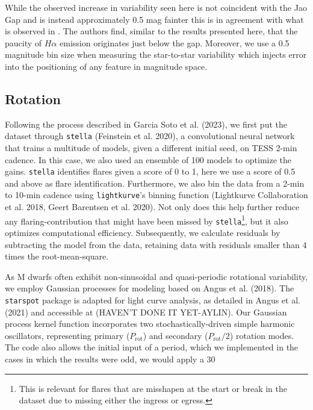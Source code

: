 While the observed increase in variability seen here is not coincident with the Jao Gap and is instead approximately 0.5 mag fainter this is in agreement with what is observed in \citet{Jao2023}. The authors find, similar to the results presented here, that the paucity of $H\alpha$ emission originates just below the gap. Moreover, we use a 0.5 magnitude bin size when measuring the star-to-star variability which injects error into the positioning of any feature in magnitude space.

\subsection{Rotation}
Following the process described in Garcia Soto et al. (2023), we first put the dataset through \texttt{stella} (Feinstein et al. 2020), a convolutional neural network that trains a multitude of models, given a different initial seed, on TESS 2-min cadence. In this case, we also used an ensemble of 100 models to optimize the gains. \texttt{stella} identifies flares given a score of 0 to 1, here we use a score of 0.5 and above as flare identification. Furthermore, we also bin the data from a 2-min to 10-min cadence using \texttt{lightkurve}'s binning function (Lightkurve Collaboration et al. 2018, Geert Barentsen et al. 2020). Not only does this help further reduce any flaring-contribution that might have been missed by \texttt{stella}\footnote{This is relevant for flares that are misshapen at the start or break in the dataset due to missing either the ingress or egress.}, but it also optimizes computational efficiency. Subsequently, we calculate residuals by subtracting the model from the data, retaining data with residuals smaller than 4 times the root-mean-square.

As M dwarfs often exhibit non-sinusoidal and quasi-periodic rotational variability, we employ Gaussian processes for modeling based on Angus et al. (2018). The \texttt{starspot} package is adapted for light curve analysis, as detailed in Angus et al. (2021) and accessible at (HAVEN'T DONE IT YET-AYLIN). Our Gaussian process kernel function incorporates two stochastically-driven simple harmonic oscillators, representing primary ($P_\textrm{rot}$) and secondary ($P_\textrm{rot}/2$) rotation modes. The code also allows the initial input of a period, which we implemented in the cases in which the results were odd, we would apply a 30%


